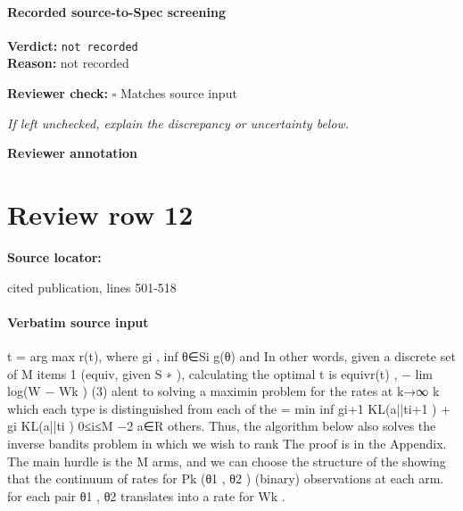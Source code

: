 \documentclass[10pt]{article}
\newcommand{\reviewerbox}{%
  \par\noindent\fbox{\parbox{0.96\linewidth}{\rule{0pt}{0.38in}}}\par
}
\newcommand{\reviewmatch}[1]{%
  \par\noindent\textbf{Reviewer check:} $\square$\; #1\par
  \noindent\emph{If left unchecked, explain the discrepancy or uncertainty below.}\par
}
\begin{document}
\paragraph{Recorded source-to-Spec screening}
\textbf{Verdict:} \texttt{not recorded}
\\
\textbf{Reason:} not recorded
\reviewmatch{Matches source input}
\noindent\textbf{Reviewer annotation}\par
\reviewerbox
\clearpage
\hypertarget{source-claim-8a7eb113492e3a82}{}
\section*{Review row 12}
\textbf{Source locator:} {\footnotesize\raggedright cited publication, lines 501-\allowbreak{}518\par}
\paragraph{Verbatim source input}
\begin{ReviewVerbatim}
t = arg max r(t), where gi , inf θ∈Si g(θ) and
In other words, given a discrete set of M items
1
(equiv, given S ∗ ), calculating the optimal t is equivr(t) , − lim log(W − Wk )
(3)
alent to solving a maximin problem for the rates at
k→∞ k
which
each type is distinguished from each of the
= min inf {gi+1 KL(a||ti+1 ) + gi KL(a||ti )}
0≤i≤M −2 a∈R
others. Thus, the algorithm below also solves the
inverse bandits problem in which we wish to rank
The proof is in the Appendix. The main hurdle is
the M arms, and we can choose the structure of the
showing that the continuum of rates for Pk (θ1 , θ2 )
(binary) observations at each arm.
for each pair θ1 , θ2 translates into a rate for Wk .
\end{ReviewVerbatim}
\end{document}
